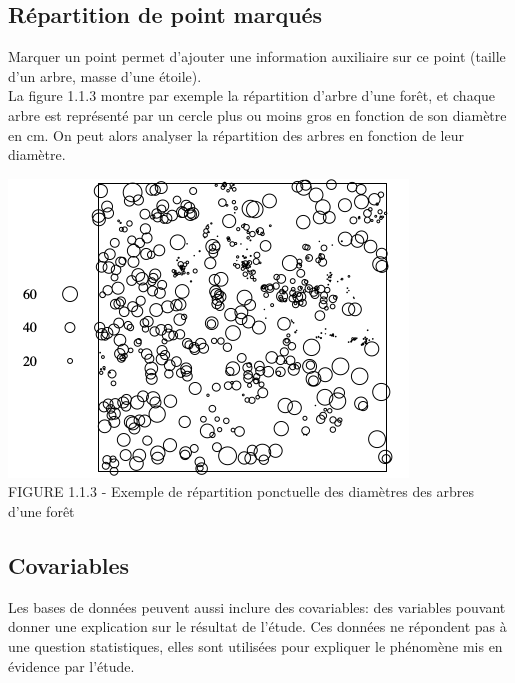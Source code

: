 \documentclass[french,12pt,a4paper]{report}
\begin{document}
\subsection{Répartition de point marqués}
\begin{minipage}{0.45\linewidth}
Marquer un point permet d'ajouter une information auxiliaire sur ce point (taille d'un arbre, masse d'une étoile).\\

La figure 1.1.3 montre par exemple la répartition d'arbre d'une forêt, et chaque arbre est représenté par un cercle plus ou moins gros en fonction de son diamètre en cm. On peut alors analyser la répartition des arbres en fonction de leur diamètre.
\end{minipage}\hfill
\begin{minipage}{0.45\linewidth}
\includegraphics[scale=0.5]{images/pointsMarques.png}\\
\small{FIGURE 1.1.3 - Exemple de répartition ponctuelle des diamètres des arbres d'une forêt}
\end{minipage}

\subsection{Covariables}
Les bases de données peuvent aussi inclure des covariables: des variables pouvant donner une explication sur le résultat de l'étude. Ces données ne répondent pas à une question statistiques, elles sont utilisées pour expliquer le phénomène mis en évidence par l'étude.\\
\end{document}
